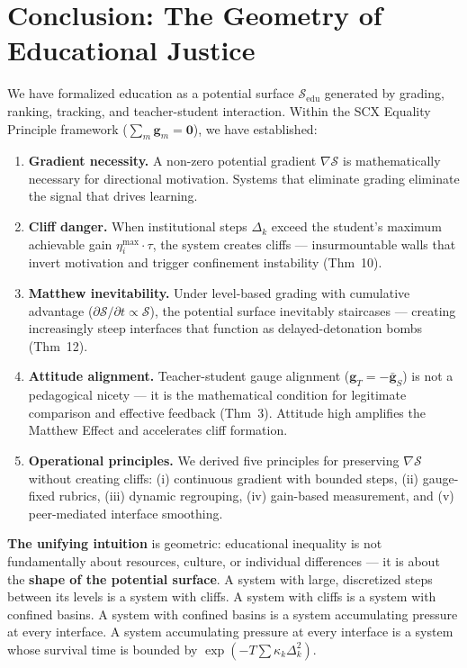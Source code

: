 \documentclass[11pt,a4paper]{article}
\newcommand{\cS}{\mathcal{S}}
\newcommand{\gradS}{\nabla\mathcal{S}}
\newcommand{\sumgd}{\sum_m \mathbf{g}_m = \mathbf{0}}
\begin{document}
\section{Conclusion: The Geometry of Educational Justice}
\label{sec:conclusion}
We have formalized education as a potential surface $\cS_{\text{edu}}$ generated by grading, ranking, tracking, and teacher-student interaction. Within the SCX Equality Principle framework ($\sumgd$), we have established:
\begin{enumerate}[label=(\arabic*)]
    \item \textbf{Gradient necessity.} A non-zero potential gradient $\gradS$ is mathematically necessary for directional motivation. Systems that eliminate grading eliminate the signal that drives learning.
    \item \textbf{Cliff danger.} When institutional steps $\Delta_k$ exceed the student's maximum achievable gain $\eta_i^{\max} \cdot \tau$, the system creates cliffs — insurmountable walls that invert motivation and trigger confinement instability (Thm~10).
    \item \textbf{Matthew inevitability.} Under level-based grading with cumulative advantage ($\partial\cS/\partial t \propto \cS$), the potential surface inevitably staircases — creating increasingly steep interfaces that function as delayed-detonation bombs (Thm~12).
    \item \textbf{Attitude alignment.} Teacher-student gauge alignment ($\mathbf{g}_T = -\bar{\mathbf{g}}_S$) is not a pedagogical nicety — it is the mathematical condition for legitimate comparison and effective feedback (Thm~3). Attitude high amplifies the Matthew Effect and accelerates cliff formation.
    \item \textbf{Operational principles.} We derived five principles for preserving $\gradS$ without creating cliffs: (i) continuous gradient with bounded steps, (ii) gauge-fixed rubrics, (iii) dynamic regrouping, (iv) gain-based measurement, and (v) peer-mediated interface smoothing.
\end{enumerate}
\textbf{The unifying intuition} is geometric: educational inequality is not fundamentally about resources, culture, or individual differences — it is about the \textbf{shape of the potential surface}. A system with large, discretized steps between its levels is a system with cliffs. A system with cliffs is a system with confined basins. A system with confined basins is a system accumulating pressure at every interface. A system accumulating pressure at every interface is a system whose survival time is bounded by $\exp(-T \sum \kappa_k \Delta_k^2)$.
\end{document}
